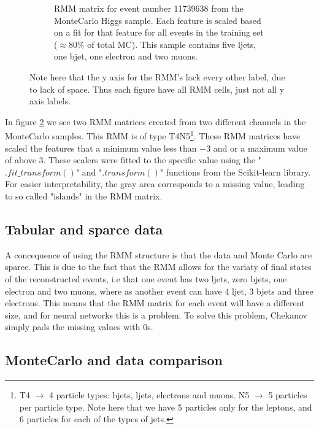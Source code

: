 \begin{figure}[h!]
\begin{subfigure}{.8\textwidth}
        \caption{ RMM matrix for event number 11739638 from the MonteCarlo Higgs sample. Each feature is scaled based on a fit for that feature for 
        all events in the training set ($\approx 80\%$ of total MC). This sample contains five ljets, one bjet, one electron and two muons. }
        \label{fig:rmm_higgs_event}
    \end{subfigure}
    \hfill        
    \caption{Note here that the y axis for the RMM's lack every other label, due to lack of space. Thus each figure have all RMM cells, 
    just not all y axis labels.  }
    \label{fig:rmm_singular_events}
\end{figure}

In figure \ref{fig:rmm_singular_events} we see two RMM matrices created from two different channels in the MonteCarlo samples. 
This RMM is of type T4N5\footnote{T4 $\to$ 4 particle types: bjets, ljets, electrons and muons. N5 $\to$ 5 particles per 
particle type. Note here that we have 5 particles only for the leptons, and 6 particles for each of the types of jets.}. 
These RMM matrices have scaled the features that a minimum value less than $-3$ and or a maximum value of above $3$. These 
scalers were fitted to the specific value using the "$.fit\_transform()$" and "$.transform()$" functions from the 
Scikit-learn library\cite{scikit-learn}. For easier interpretability, the gray area corresponds to a missing value, 
leading to so called "islands" in the RMM matrix.

\subsection*{Tabular and sparce data}
A concequence of using the RMM structure is that the data and Monte Carlo are sparce. This is due to the fact that the RMM allows for 
the variaty of final states of the reconstructed events, i.e that one event has two ljets, zero bjets, one electron and two muons, where as another 
event can have 4 ljet, 3 bjets and three electrons. This means that the RMM matrix for each event will have a different size, 
and for neural networks this is a problem. To solve this problem, Chekanov simply pads the missing values with 0s\cite{Chekanov_2019}. 

\subsection*{MonteCarlo and data comparison}\label{sec:mcdatacomp}

